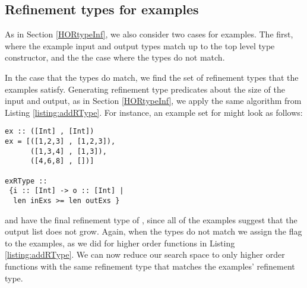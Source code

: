 \subsection{Refinement types for examples}
As in Section \ref{HORtypeInf}, we also consider two cases for examples. The first, where the example input and output types match up to the top level type constructor, and the the case where the types do not match.

In the case that the types do match, we find the set of refinement types that the examples satisfy. Generating refinement type predicates about the size of the input and output, as in Section \ref{HORtypeInf}, we apply the same algorithm from Listing \ref{listing:addRType}. 
For instance, an example set for  might look as follows:

\begin{lstlisting}[caption=Refinement type inference for examples,label=exRTypeGen]
ex :: ([Int] , [Int])
ex = [([1,2,3] , [1,2,3]),
      ([1,3,4] , [1,3]),
      ([4,6,8] , [])]
       
exRType ::
 {i :: [Int] -> o :: [Int] |
  len inExs >= len outExs }
\end{lstlisting}

\noindent and have the final refinement type of , since all of the examples suggest that the output list does not grow. 
Again, when the types do not match we assign the  flag to the examples, as we did for higher order functions in Listing \ref{listing:addRType}.
We can now reduce our search space to only higher order functions with the same refinement type that matches the examples' refinement type. 
